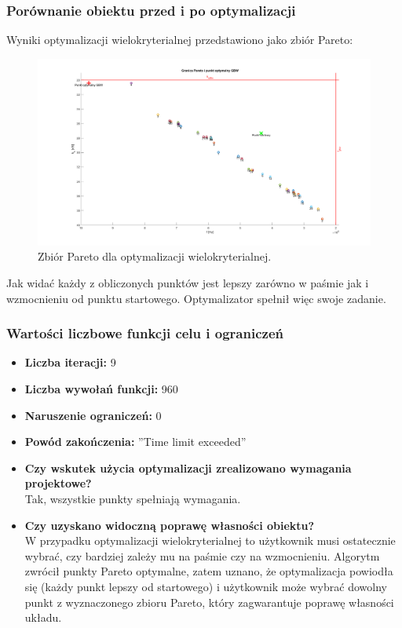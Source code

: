 \documentclass{article}
\begin{document}
\subsubsection*{Porównanie obiektu przed i po optymalizacji}
Wyniki optymalizacji wielokryterialnej przedstawiono jako zbiór Pareto:
\begin{figure}[h]
    \includegraphics[width=12cm]{graphics/pareto.png}
    \centering
    \caption{Zbiór Pareto dla optymalizacji wielokryterialnej.}
\end{figure}

Jak widać każdy z obliczonych punktów jest lepszy zarówno w paśmie jak i wzmocnieniu od punktu startowego. Optymalizator spełnił więc swoje zadanie.
\subsubsection*{Wartości liczbowe funkcji celu i ograniczeń}

\begin{itemize}
    \item \textbf{Liczba iteracji:} 9
    \item \textbf{Liczba wywołań funkcji:} 960
    \item \textbf{Naruszenie ograniczeń:} 0
    \item \textbf{Powód zakończenia:} ''Time limit exceeded''
\end{itemize}





\begin{itemize}
    \item \textbf{Czy wskutek użycia optymalizacji zrealizowano wymagania projektowe?}\\
          Tak, wszystkie punkty spełniają wymagania.
    \item \textbf{Czy uzyskano widoczną poprawę własności obiektu?}\\
          W przypadku optymalizacji wielokryterialnej to użytkownik musi ostatecznie wybrać, czy bardziej zależy mu na paśmie czy na wzmocnieniu. Algorytm zwrócił punkty Pareto optymalne, zatem uznano, że
          optymalizacja powiodła się (każdy punkt lepszy od startowego) i użytkownik może wybrać dowolny punkt z wyznaczonego zbioru Pareto, który zagwarantuje poprawę własności układu.
\end{itemize}
\end{document}
